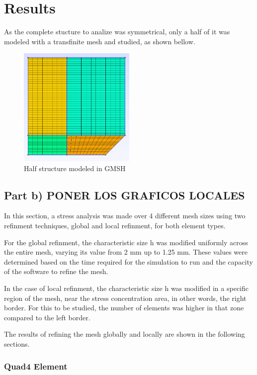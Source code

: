\section{Results}

As the complete stucture to analize was symmetrical, only a half of it was modeled with a transfinite mesh and studied, as shown bellow.

\begin{figure}[H]
    \centering
    \includegraphics[width=0.5\textwidth]{img/geometria.png}
    \caption{Half structure modeled in GMSH}
    \label{fig:half_structure}
\end{figure}

\subsection{Part b) PONER LOS GRAFICOS LOCALES}

In this section, a stress analysis was made over 4 different mesh sizes using two refinment techniques, global and local refinment, for both element types.

For the global refinment, the characteristic size h was modified uniformly across the entire mesh, varying its value from 2 mm up to 1.25 mm. These values were determined based on the time required for the simulation to run and the capacity of the software to refine the mesh.

In the case of local refinment, the characteristic size h was modified in a specific region of the mesh, near the stress concentration area, in other words, the right border. For this to be studied, the number of elements was higher in that zone compared to the left border.

The results of refining the mesh globally and locally are shown in the following sections.

\subsubsection{Quad4 Element}

